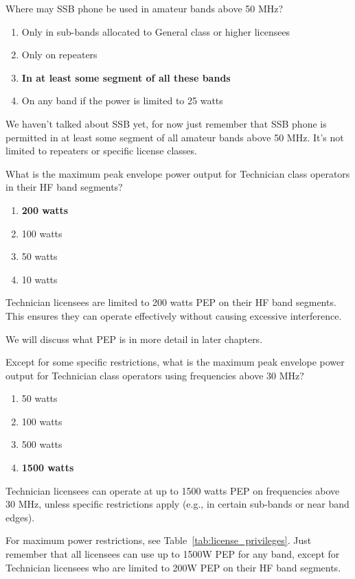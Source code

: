 \begin{tcolorbox}[colback=gray!10!white,colframe=black!75!black,title={T1B10}]
    Where may SSB phone be used in amateur bands above 50 MHz?
    \begin{enumerate}[label=\Alph*),noitemsep]
        \item Only in sub-bands allocated to General class or higher licensees
        \item Only on repeaters
        \item \textbf{In at least some segment of all these bands}
        \item On any band if the power is limited to 25 watts
    \end{enumerate}
\end{tcolorbox}
We haven't talked about SSB yet, for now just remember that SSB phone is permitted in at least some segment of all amateur bands above 50 MHz. It’s not limited to repeaters or specific license classes.

\begin{tcolorbox}[colback=gray!10!white,colframe=black!75!black,title={T1B11}]
    What is the maximum peak envelope power output for Technician class operators in their HF band segments?
    \begin{enumerate}[label=\Alph*),noitemsep]
        \item \textbf{200 watts}
        \item 100 watts
        \item 50 watts
        \item 10 watts
    \end{enumerate}
\end{tcolorbox}
Technician licensees are limited to 200 watts PEP on their HF band segments. This ensures they can operate effectively without causing excessive interference.

We will discuss what PEP is in more detail in later chapters.

\begin{tcolorbox}[colback=gray!10!white,colframe=black!75!black,title={T1B12}]
    Except for some specific restrictions, what is the maximum peak envelope power output for Technician class operators using frequencies above 30 MHz?
    \begin{enumerate}[label=\Alph*),noitemsep]
        \item 50 watts
        \item 100 watts
        \item 500 watts
        \item \textbf{1500 watts}
    \end{enumerate}
\end{tcolorbox}
Technician licensees can operate at up to 1500 watts PEP on frequencies above 30 MHz, unless specific restrictions apply (e.g., in certain sub-bands or near band edges).

For maximum power restrictions, see Table~\ref{tab:license_privileges}. Just remember that all licensees can use up to 1500W PEP for any band, except for Technician licensees who are limited to 200W PEP on their HF band segments.